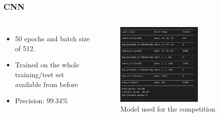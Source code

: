 \documentclass[aspectratio=169]{beamer}
\begin{document}
\begin{frame}[t]
    \frametitle{CNN}

    

    \begin{columns}

        \begin{itemize}
            \item 50 epochs and batch size of 512.
            \item Trained on the whole training/test set available from before
            \item Precision: 99.34\%
        \end{itemize}
        \begin{figure}[ht!]
            \centering
            \includegraphics[width=0.7\textwidth]{figures/cnn_archi.png}
            \caption{Model used for the competition}
            \label{fig:cnn_model}
        \end{figure}
    \end{columns}
\end{frame}
\end{document}

